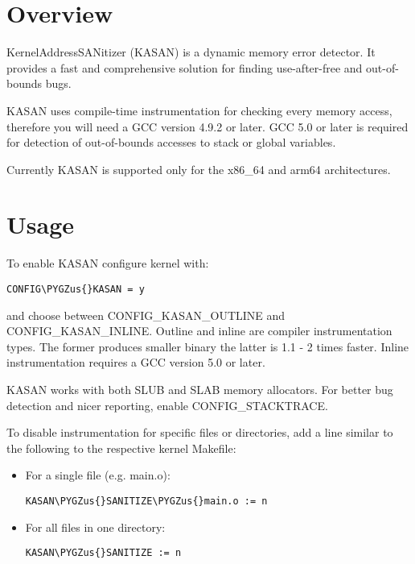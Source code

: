 \documentclass[a4paper,8pt,english]{sphinxmanual}
\def\PYGZus{\char`\_}
\begin{document}
\section{Overview}
\label{dev-tools/kasan:overview}
KernelAddressSANitizer (KASAN) is a dynamic memory error detector. It provides
a fast and comprehensive solution for finding use-after-free and out-of-bounds
bugs.

KASAN uses compile-time instrumentation for checking every memory access,
therefore you will need a GCC version 4.9.2 or later. GCC 5.0 or later is
required for detection of out-of-bounds accesses to stack or global variables.

Currently KASAN is supported only for the x86\_64 and arm64 architectures.


\section{Usage}
\label{dev-tools/kasan:usage}
To enable KASAN configure kernel with:

\begin{Verbatim}[commandchars=\\\{\}]
CONFIG\PYGZus{}KASAN = y
\end{Verbatim}

and choose between CONFIG\_KASAN\_OUTLINE and CONFIG\_KASAN\_INLINE. Outline and
inline are compiler instrumentation types. The former produces smaller binary
the latter is 1.1 - 2 times faster. Inline instrumentation requires a GCC
version 5.0 or later.

KASAN works with both SLUB and SLAB memory allocators.
For better bug detection and nicer reporting, enable CONFIG\_STACKTRACE.

To disable instrumentation for specific files or directories, add a line
similar to the following to the respective kernel Makefile:
\begin{itemize}
\item {} 
For a single file (e.g. main.o):

\begin{Verbatim}[commandchars=\\\{\}]
KASAN\PYGZus{}SANITIZE\PYGZus{}main.o := n
\end{Verbatim}

\item {} 
For all files in one directory:

\begin{Verbatim}[commandchars=\\\{\}]
KASAN\PYGZus{}SANITIZE := n
\end{Verbatim}

\end{itemize}
\end{document}
